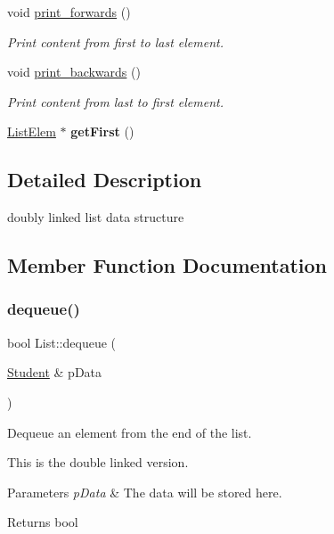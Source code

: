 \begin{DoxyCompactItemize}
void \hyperlink{class_list_a9cd9aa3b710f2c17acbc41a9c376f337}{print\+\_\+forwards} ()
\begin{DoxyCompactList}\small\item\em Print content from first to last element. \end{DoxyCompactList}\item 
void \hyperlink{class_list_aeff87699c50ed381ba1e765d372ad54b}{print\+\_\+backwards} ()
\begin{DoxyCompactList}\small\item\em Print content from last to first element. \end{DoxyCompactList}\item 
\mbox{\label{class_list_a712f66293527faeb102e0520181ef5a7}} 
\hyperlink{class_list_elem}{List\+Elem} $\ast$ {\bfseries get\+First} ()
\end{DoxyCompactItemize}


\subsection{Detailed Description}
doubly linked list data structure 

\subsection{Member Function Documentation}
\mbox{\label{class_list_addc22172363ef656a20069489a1d003f}} 
\subsubsection{\texorpdfstring{dequeue()}{dequeue()}}
{\footnotesize\ttfamily bool List\+::dequeue (\begin{DoxyParamCaption}\item[{\hyperlink{class_student}{Student} \&}]{p\+Data }\end{DoxyParamCaption})}



Dequeue an element from the end of the list. 

This is the double linked version.


\begin{DoxyParams}{Parameters}
{\em p\+Data} & The data will be stored here. \\
\hline
\end{DoxyParams}
\begin{DoxyReturn}{Returns}
bool 
\end{DoxyReturn}
\mbox{\label{class_list_abe1c128f9a438009a7ebe1ff946963cf}} 
